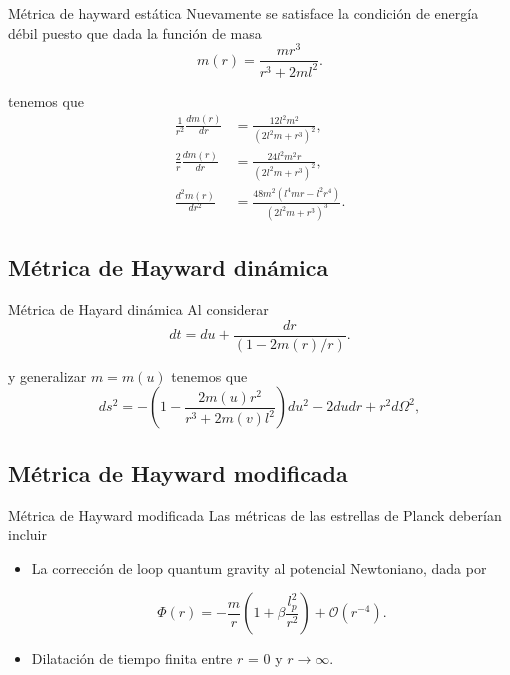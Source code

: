 \documentclass[t]{beamer}
\numberwithin{equation}{section}
\begin{document}
\begin{frame}{Métrica de hayward estática}
\vspace*{\fill}
Nuevamente se satisface la condición de energía débil puesto que dada la función de masa
\begin{equation}
\label{hayward mass}
m(r) =  \frac{mr^3}{r^3 + 2ml^2}.
\end{equation}

tenemos que
\begin{equation}
\begin{aligned}
\frac{1}{r^2}\frac{dm(r)}{dr} &= \frac{12 l^2 m^2}{\left(2 l^2 m+r^3\right)^2},\\
\frac{2}{r}\frac{dm(r)}{dr} &= \frac{24 l^2 m^2 r}{\left(2 l^2 m+r^3\right)^2},\\
\frac{d^2m(r)}{dr^2} &= \frac{48 m^2 \left(l^4 m r-l^2 r^4\right)}{\left(2 l^2 m+r^3\right)^3}.
\end{aligned}
\end{equation}
\end{frame}


\subsection{Métrica de Hayward dinámica}

\begin{frame}{Métrica de Hayard dinámica}
\vspace*{\fill}
Al considerar 
\begin{equation}
dt = du + \frac{dr}{(1 - 2m(r)/r)}.
\end{equation}

y generalizar $m = m(u)$ tenemos que 
\begin{equation}
\label{hayward-tortoise}
ds^2 = -\left( 1 - \frac{2m(u)r^2}{r^3 + 2m(v)l^2} \right) du^2 - 2dudr + r^2d\Omega ^2,
\end{equation}

\end{frame}


\subsection{Métrica de Hayward modificada}

\begin{frame}{Métrica de Hayward modificada}
\vspace*{\fill}
Las métricas de las estrellas de Planck deberían incluir \cite{lorenzo}

\begin{itemize}
\item La corrección de loop quantum gravity al potencial Newtoniano, dada por

\begin{equation}
\label{newF}
\Phi (r) = -\frac{m}{r} \left( 1 + \beta \frac{l_{p}^2}{r^2} \right) + \mathcal{O}(r^{-4}).
\end{equation}

\item Dilatación de tiempo finita entre $r$ = 0 y $r \to \infty$.
\end{itemize}

\end{frame}
\end{document}
